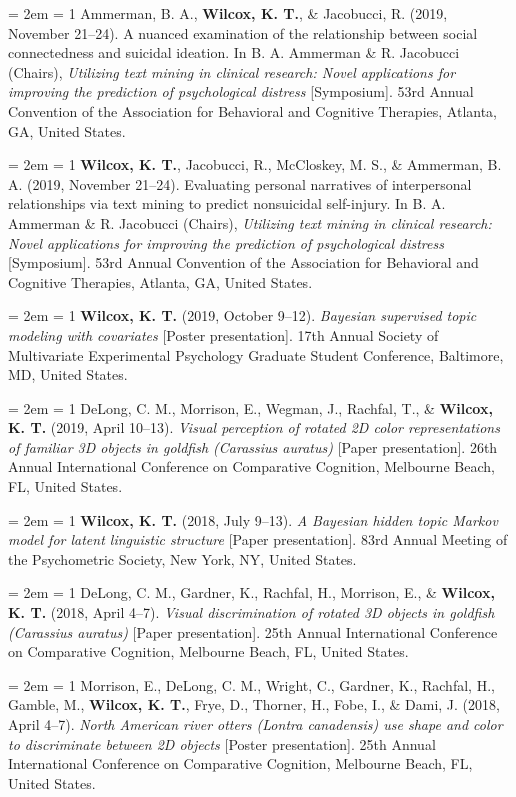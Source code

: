 \documentclass[
  12 pt,
]{article}
\begin{document}
\hangindent = 2em \hangafter = 1 Ammerman, B. A., \textbf{Wilcox, K.
T.}, \& Jacobucci, R. (2019, November 21--24). A nuanced examination of
the relationship between social connectedness and suicidal ideation. In
B. A. Ammerman \& R. Jacobucci (Chairs), \emph{Utilizing text mining in
clinical research: Novel applications for improving the prediction of
psychological distress} {[}Symposium{]}. 53rd Annual Convention of the
Association for Behavioral and Cognitive Therapies, Atlanta, GA, United
States.

\hangindent = 2em \hangafter = 1 \textbf{Wilcox, K. T.}, Jacobucci, R.,
McCloskey, M. S., \& Ammerman, B. A. (2019, November 21--24). Evaluating
personal narratives of interpersonal relationships via text mining to
predict nonsuicidal self-injury. In B. A. Ammerman \& R. Jacobucci
(Chairs), \emph{Utilizing text mining in clinical research: Novel
applications for improving the prediction of psychological distress}
{[}Symposium{]}. 53rd Annual Convention of the Association for
Behavioral and Cognitive Therapies, Atlanta, GA, United States.

\hangindent = 2em \hangafter = 1 \textbf{Wilcox, K. T.} (2019, October
9--12). \emph{Bayesian supervised topic modeling with covariates}
{[}Poster presentation{]}. 17th Annual Society of Multivariate
Experimental Psychology Graduate Student Conference, Baltimore, MD,
United States.

\hangindent = 2em \hangafter = 1 DeLong, C. M., Morrison, E., Wegman,
J., Rachfal, T., \& \textbf{Wilcox, K. T.} (2019, April 10--13).
\emph{Visual perception of rotated 2D color representations of familiar
3D objects in goldfish (Carassius auratus)} {[}Paper presentation{]}.
26th Annual International Conference on Comparative Cognition, Melbourne
Beach, FL, United States.

\hangindent = 2em \hangafter = 1 \textbf{Wilcox, K. T.} (2018, July
9--13). \emph{A Bayesian hidden topic Markov model for latent linguistic
structure} {[}Paper presentation{]}. 83rd Annual Meeting of the
Psychometric Society, New York, NY, United States.

\hangindent = 2em \hangafter = 1 DeLong, C. M., Gardner, K., Rachfal,
H., Morrison, E., \& \textbf{Wilcox, K. T.} (2018, April 4--7).
\emph{Visual discrimination of rotated 3D objects in goldfish (Carassius
auratus)} {[}Paper presentation{]}. 25th Annual International Conference
on Comparative Cognition, Melbourne Beach, FL, United States.

\hangindent = 2em \hangafter = 1 Morrison, E., DeLong, C. M., Wright,
C., Gardner, K., Rachfal, H., Gamble, M., \textbf{Wilcox, K. T.}, Frye,
D., Thorner, H., Fobe, I., \& Dami, J. (2018, April 4--7). \emph{North
American river otters (Lontra canadensis) use shape and color to
discriminate between 2D objects} {[}Poster presentation{]}. 25th Annual
International Conference on Comparative Cognition, Melbourne Beach, FL,
United States.
\end{document}
